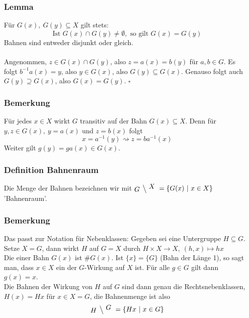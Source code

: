 \subsubsection*{Lemma}
Für  $G(x),~G(y)\subseteq X$ gilt stets:
\[
\text{Ist } G(x)\cap G(y)\not=\emptyset, \text{ so gilt } G(x)=G(y)
\]
Bahnen sind entweder disjunkt oder gleich.\\

\\
Angenommen, $z\in G(x)\cap G(y)$, also $z=a(x)=b(y)$ für $a,b\in G$.
Es folgt $b^{-1}a(x)=y$, also $y\in G(x)$, also $G(y)\subseteq G(x)$.
Genauso folgt auch $G(y)\supseteq G(x)$, also $G(x)=G(y)$.
\hfill $\square$

\subsubsection*{Bemerkung}
Für jedes $x\in X$ wirkt $G$ transitiv auf der Bahn $G(x)\subseteq X$.
Denn für $y,z\in G(x),~y=a(x)$ und $z=b(x)$ folgt
\[
x=a^{-1}(y) \rightsquigarrow z=ba^{-1}(x)
\]
Weiter gilt $g(y)=ga(x)\in G(x)$.

\subsubsection*{Definition Bahnenraum}
Die Menge der Bahnen bezeichnen wir mit $\xfrac{G}{X}=\{G(x)~|~x\in X \}$ 'Bahnenraum'.

\subsubsection*{Bemerkung}
Das passt zur Notation für Nebenklassen: 
Gegeben sei eine Untergruppe $H\subseteq G$. 
Setze $X=G$, dann wirkt $H$ auf $G=X$ durch $H\times X\to X,~(h,x)\mapsto hx$\\
Die  einer Bahn $G(x)$ ist $\#G(x)$. 
Ist $\{x\}=\{G\}$ (Bahn der Länge 1), so sagt man, dass $x\in X$ ein  der $G$-Wirkung auf $X$ ist. 
Für alle $g\in G$ gilt dann $g(x)=x$.\\
Die Bahnen der Wirkung von $H$ auf $G$ sind dann genau die Rechtsnebenklassen, $H(x)=Hx$ für $x\in X=G$, die Bahnenmenge ist also 
\[
\xfrac{H}{G}=\{Hx~|~x\in G\}
\]

\newpage
